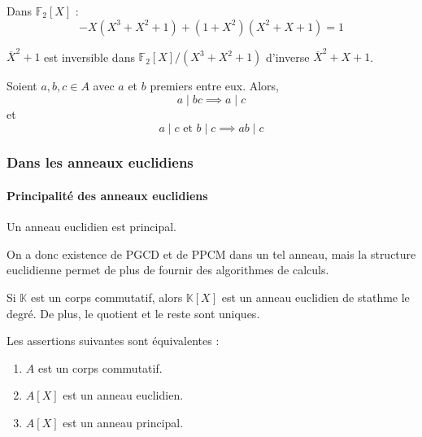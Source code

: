 
  \begin{example}
    Dans $\mathbb{F}_2[X]$ :
    \[ -X(X^3+X^2+1) + (1+X^2)(X^2+X+1) = 1 \]
  \end{example}

  \begin{application}
    $\overline{X}^2+1$ est inversible dans $\mathbb{F}_2[X]/(X^3 + X^2 + 1)$ d'inverse $\overline{X}^2+X+1$.
  \end{application}


  \begin{lemma}
    Soient $a, b, c \in A$ avec $a$ et $b$ premiers entre eux. Alors,
    \[ a \mid bc \implies a \mid c \]
    et
    \[ a \mid c \text{ et } b \mid c \implies ab \mid c \]
  \end{lemma}

  \subsubsection{Dans les anneaux euclidiens}

  \paragraph{Principalité des anneaux euclidiens}

  \begin{proposition}
    Un anneau euclidien est principal.
  \end{proposition}

  On a donc existence de PGCD et de PPCM dans un tel anneau, mais la structure euclidienne permet de plus de fournir des algorithmes de calculs.


  \begin{theorem}
    Si $\mathbb{K}$ est un corps commutatif, alors $\mathbb{K}[X]$ est un anneau euclidien de stathme le degré. De plus, le quotient et le reste sont uniques.
  \end{theorem}

  \begin{corollary}
    Les assertions suivantes sont équivalentes :
    \begin{enumerate}[label={\bfseries(\roman*)}]
      \item $A$ est un corps commutatif.
      \item $A[X]$ est un anneau euclidien.
      \item $A[X]$ est un anneau principal.
    \end{enumerate}
  \end{corollary}

